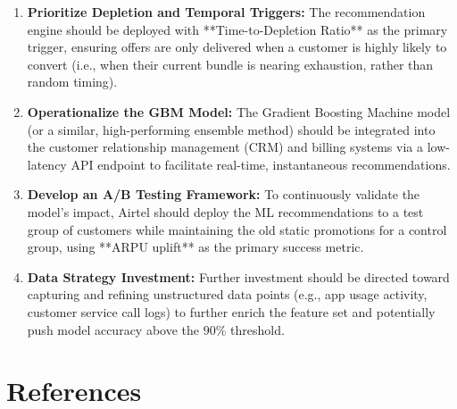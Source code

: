 \documentclass[12pt, a4paper]{report}
\begin{document}
\begin{enumerate}
    \item \textbf{Prioritize Depletion and Temporal Triggers:} The recommendation engine should be deployed with **Time-to-Depletion Ratio** as the primary trigger, ensuring offers are only delivered when a customer is highly likely to convert (i.e., when their current bundle is nearing exhaustion, rather than random timing).
    \item \textbf{Operationalize the GBM Model:} The Gradient Boosting Machine model (or a similar, high-performing ensemble method) should be integrated into the customer relationship management (CRM) and billing systems via a low-latency API endpoint to facilitate real-time, instantaneous recommendations.
    \item \textbf{Develop an A/B Testing Framework:} To continuously validate the model's impact, Airtel should deploy the ML recommendations to a test group of customers while maintaining the old static promotions for a control group, using **ARPU uplift** as the primary success metric.
    \item \textbf{Data Strategy Investment:} Further investment should be directed toward capturing and refining unstructured data points (e.g., app usage activity, customer service call logs) to further enrich the feature set and potentially push model accuracy above the $90\%$ threshold.
\end{enumerate}

\clearpage

\chapter*{References}

\end{document}

